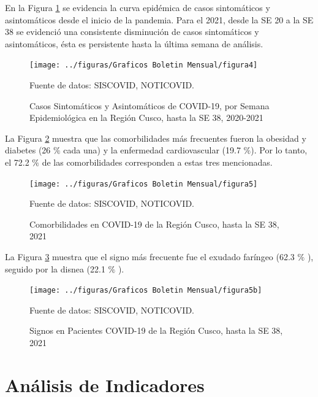 \documentclass[12pt,a4paper,openany]{book}
\begin{document}
	En la Figura \ref{fig:sintomaticos_asintomati} se evidencia la curva epidémica de casos sintomáticos y asintomáticos desde el inicio de la pandemia. Para el 2021, desde la SE 20 a la SE 38 se evidenció una consistente disminución de casos sintomáticos y asintomáticos, ésta es persistente hasta la última semana de análisis.
	\medskip
	
	\begin{figure}[h]
	\caption{Casos Sintomáticos y Asintomáticos de COVID-19, por Semana Epidemiológica en la Región Cusco, hasta la SE 38, 2020-2021  }\label{fig:sintomaticos_asintomati}
	\begin{center}
		\texttt{[image: ../figuras/Graficos Boletin Mensual/figura4]}
	\end{center}
	{\footnotesize {Fuente de datos: SISCOVID, NOTICOVID.}}
	\end{figure}


	La Figura \ref{fig:comorbilidades} muestra que las comorbilidades más frecuentes fueron la obesidad y diabetes (26 $\%$ cada una) y la enfermedad cardiovascular (19.7 $\%$). Por lo tanto, el 72.2 $\%$ de las comorbilidades corresponden a estas tres mencionadas.
	
	\begin{figure}[h]
	\caption{Comorbilidades en COVID-19 de la Región Cusco, hasta la SE 38, 2021}\label{fig:comorbilidades}
	\begin{center}
		\texttt{[image: ../figuras/Graficos Boletin Mensual/figura5]}
	\end{center}
	{\footnotesize {Fuente de datos: SISCOVID, NOTICOVID.}}
	\end{figure}

	La Figura \ref{fig:sign} muestra que el signo más frecuente fue el exudado faríngeo (62.3 $\%$ ), seguido por la disnea (22.1 $\%$ ).
	
	\begin{figure}[h]
	\caption{Signos en Pacientes COVID-19 de la Región Cusco, hasta la SE 38, 2021}\label{fig:sign}
	\begin{center}
		\texttt{[image: ../figuras/Graficos Boletin Mensual/figura5b]}
	\end{center}{\footnotesize {Fuente de datos: SISCOVID, NOTICOVID.}}
	\end{figure}

    \chapter*{Análisis de Indicadores}
   
\end{document}
